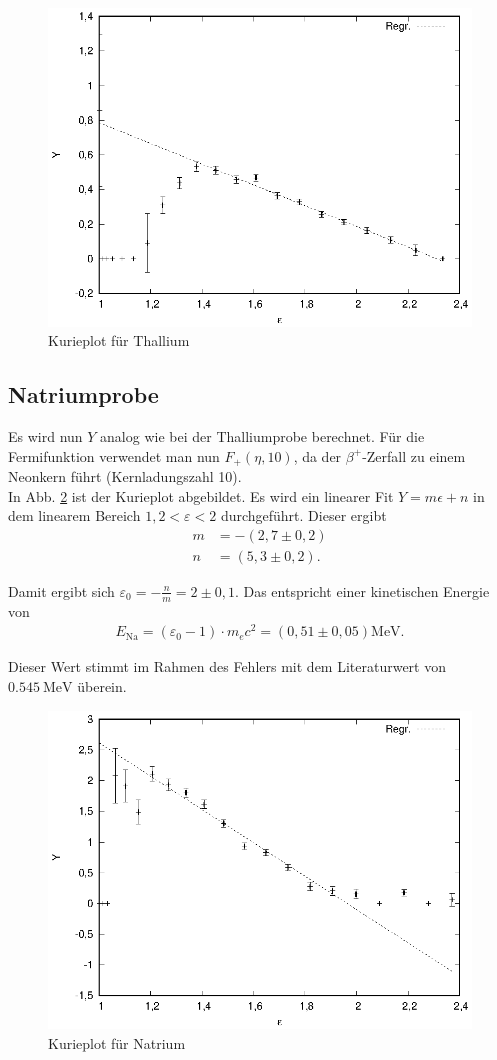 \begin{figure}[h]
\centering
\includegraphics[width=0.75\linewidth]{data/ti.eps}
\caption{Kurieplot für Thallium}
\label{fig:tl}
\end{figure}

\newpage

\subsection{Natriumprobe}
Es wird nun $Y$ analog wie bei der Thalliumprobe berechnet. Für die Fermifunktion verwendet man nun $F_+(\eta, 10)$, da der $\beta^+$-Zerfall zu einem Neonkern führt (Kernladungszahl 10).\\

In Abb. \ref{fig:na} ist der Kurieplot abgebildet. Es wird ein linearer Fit $Y = m \epsilon + n$ in dem linearem Bereich $1,2 < \varepsilon < 2$ durchgeführt. Dieser ergibt
\begin{align*}
m &= -\si{(2,7\pm 0,2)}\\
n &= \si{(5,3 \pm 0,2)}.
\end{align*}

Damit ergibt sich $\varepsilon_0 = -\frac{n}{m} = 2 \pm 0,1$. Das entspricht einer kinetischen Energie von
\begin{align*}
E_\mathrm{Na} = (\varepsilon_0 - 1)\cdot m_ec^2 = \si{(0,51 \pm 0,05)\mega\eV}.
\end{align*}

Dieser Wert stimmt im Rahmen des Fehlers mit dem Literaturwert\cite{naenergy} von $\SI{0,545}{\mega\eV}$ überein.

\begin{figure}[h]
\centering
\includegraphics[width=0.75\linewidth]{data/na.eps}
\caption{Kurieplot für Natrium}
\label{fig:na}
\end{figure}
